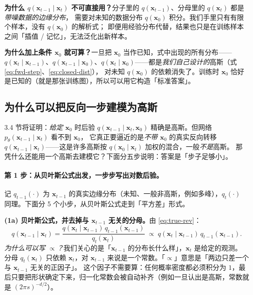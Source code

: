 \documentclass[a4paper,fontset=none,zihao=5]{ctexart}
\numberwithin{equation}{section}
\newcommand{\x}{\mathbf{x}}
\begin{document}
\begin{whybox}
\textbf{为什么 $q(\x_{t-1}\mid\x_t)$ 不可直接用？}分子里的 $q(\x_{t-1})$、分母里的 $q(\x_t)$ 都是\emph{带噪数据的边缘分布}，
需要对未知的数据分布 $q(\x_0)$ 积分。我们手里只有有限个样本，没有 $q(\x_0)$ 的解析式；
即便用经验分布代替，结果也只是在训练样本之间「插值 / 记忆」，无法泛化出新样本。

\textbf{为什么加上条件 $\x_0$ 就可算？}一旦把 $\x_0$ 当作已知，式中出现的所有分布——
$q(\x_t\mid\x_{t-1})$、$q(\x_{t-1}\mid\x_0)$、$q(\x_t\mid\x_0)$——都是\emph{我们自己设计的}高斯（式 \eqref{eq:fwd-step}、\eqref{eq:closed-dist}），
对未知 $q(\x_0)$ 的依赖消失了。训练时 $\x_0$ 恰好是已知的（就是那张训练图），所以可以用它构造「标准答案」。
\end{whybox}

\subsection{为什么可以把反向一步建模为高斯}
3.4 节将证明：\emph{给定 $\x_0$} 时后验 $q(\x_{t-1}\mid\x_t,\x_0)$ 精确是高斯。但网络 $p_\theta(\x_{t-1}\mid\x_t)$ 看不到 $\x_0$，
它真正要逼近的是\emph{不带 $\x_0$} 的真实反向转移 $q(\x_{t-1}\mid\x_t)$——这是许多高斯按 $q(\x_0\mid\x_t)$ 加权的混合，一般\emph{不是}高斯。
那凭什么还能用一个高斯去建模它？下面分五步说明：答案是「步子足够小」。

\paragraph{第 1 步：从贝叶斯公式出发，一步步写出对数后验。}
记 $q_{t-1}(\cdot)$ 为 $\x_{t-1}$ 的真实边缘分布（未知、一般非高斯，例如多峰），$q_t(\cdot)$ 同理。下面分 5 个小步，从贝叶斯公式走到「平方差」形式。

\textbf{(1a) 贝叶斯公式，并去掉与 $\x_{t-1}$ 无关的分母。}由 \eqref{eq:true-rev}：
\begin{equation}
  q(\x_{t-1}\mid\x_t)=\frac{q(\x_t\mid\x_{t-1})\,q_{t-1}(\x_{t-1})}{q_t(\x_t)}\;\propto\;q(\x_t\mid\x_{t-1})\,q_{t-1}(\x_{t-1}).
  \label{eq:bayes-true}
\end{equation}
\emph{为什么可以写 $\propto$？}我们关心的是「$\x_{t-1}$ 的分布长什么样」，$\x_t$ 是给定的观测。
分母 $q_t(\x_t)$ 只依赖 $\x_t$，对 $\x_{t-1}$ 来说是一个常数。「$\propto$」意思是「两边只差一个与 $\x_{t-1}$ 无关的正因子」。
这个因子不需要算：任何概率密度都必须积分为 $1$，最后只要把形状确定下来，归一化常数会被自动补齐（例如一旦认出是高斯，常数就是 $(2\pi s)^{-d/2}$）。
\end{document}
